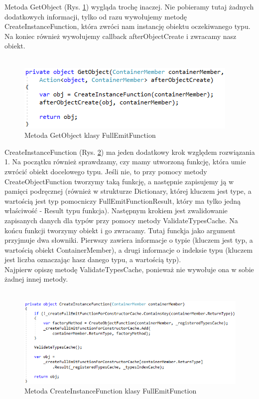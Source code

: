 \documentclass[12pt]{article}
\begin{document}
Metoda GetObject (Rys. \ref{fig:FullEmitFunction_GetObject}) wygląda trochę inaczej. Nie pobieramy tutaj żadnych dodatkowych informacji, tylko od razu wywołujemy metodę CreateInstanceFunction, która zwróci nam instancję obiektu oczekiwanego typu. Na koniec również wywołujemy callback afterObjectCreate i zwracamy nasz obiekt.\\ \\
\begin{figure}[H]
	\begin{center}
  		\includegraphics{FullEmitFunction_GetObject.png}
  		\caption{Metoda GetObject klasy FullEmitFunction}
  		\label{fig:FullEmitFunction_GetObject}
	\end{center}
\end{figure}

CreateInstanceFunction (Rys. \ref{fig:FullEmitFunction_CreateInstanceFunction}) ma jeden dodatkowy krok względem rozwiązania 1. Na początku również sprawdzamy, czy mamy utworzoną funkcję, która umie zwrócić obiekt docelowego typu. Jeśli nie, to przy pomocy metody CreateObjectFunction tworzymy taką funkcję, a następnie zapisujemy ją w pamięci podręcznej (również w strukturze Dictionary, której kluczem jest type, a wartością jest typ pomocniczy FullEmitFunctionResult, który ma tylko jedną właściwość - Result typu funkcja). Następnym krokiem jest zwalidowanie zapisanych danych dla typów przy pomocy metody ValidateTypesCache. Na końcu funkcji tworzymy obiekt  i go zwracamy. Tutaj funckja jako argument przyjmuje dwa słowniki. Pierwszy zawiera informacje o typie (kluczem jest typ, a wartością obiekt ContainerMember), a drugi informacje o indeksie typu (kluczem jest liczba oznaczając hasz danego typu, a wartością typ).\\
Najpierw opiszę metodę ValidateTypesCache, ponieważ nie wywołuje ona w sobie żadnej innej metody.\\ \\
\begin{figure}[H]
	\begin{center}
  		\includegraphics{FullEmitFunction_CreateInstanceFunction.png}
  		\caption{Metoda CreateInstanceFunction klasy FullEmitFunction}
  		\label{fig:FullEmitFunction_CreateInstanceFunction}
	\end{center}
\end{figure}
\end{document}
